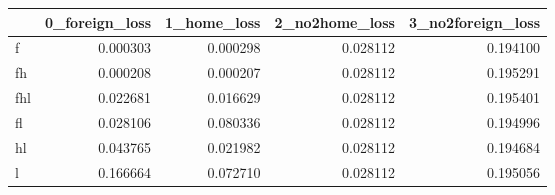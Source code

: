 \begin{tabular}{lrrrr}
\toprule
 & 0_foreign_loss & 1_home_loss & 2_no2home_loss & 3_no2foreign_loss \\
\midrule
f & 0.000303 & 0.000298 & 0.028112 & 0.194100 \\
fh & 0.000208 & 0.000207 & 0.028112 & 0.195291 \\
fhl & 0.022681 & 0.016629 & 0.028112 & 0.195401 \\
fl & 0.028106 & 0.080336 & 0.028112 & 0.194996 \\
hl & 0.043765 & 0.021982 & 0.028112 & 0.194684 \\
l & 0.166664 & 0.072710 & 0.028112 & 0.195056 \\
\bottomrule
\end{tabular}
